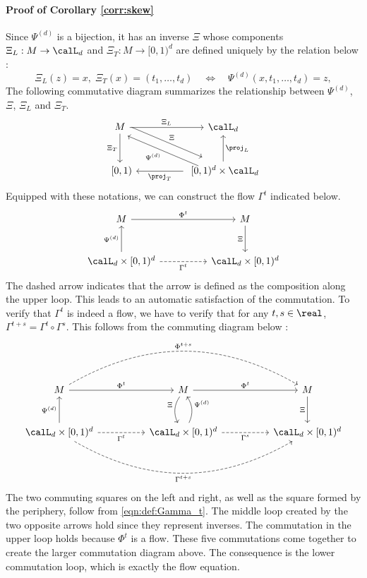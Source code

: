 \documentclass[12pt,oneside]{article}
\newcommand{\Iso}{\Psi}
\newcommand{\IsoInv}{\Xi}
\begin{document}
\paragraph{Proof of Corollary \ref{corr:skew}} Since $\Iso^{(d)}$ is a bijection, it has an inverse $\IsoInv$ whose components $\IsoInv_L : M \to \calL_d$ and  $\IsoInv_T : M\to [0,1)^d$ are defined uniquely by the relation below :
%
\begin{equation}\label{eqn:def:iso_inv}
	\IsoInv_L(z) = x, \; \IsoInv_T(x) = (t_1,\ldots,t_d) \quad \Leftrightarrow \quad \Iso^{(d)}(x,t_1,\ldots,t_d) = z,
\end{equation}
%
The following commutative diagram summarizes the relationship between $\Iso^{(d)}$, $\IsoInv$, $\IsoInv_L$ and $\IsoInv_T$.
%
\[\begin{tikzcd}[column sep = huge, row sep = large]
M \arrow{r}{\IsoInv_L} \arrow{d}[swap]{\IsoInv_T} \arrow[shift left=2]{dr}{\IsoInv} & \calL_d \\
\ [0,1) & \ [0,1)^d \times \calL_d \arrow{l}{\proj_T} \arrow{u}[swap]{\proj_L} \arrow[shift left=2]{ul}{\Iso^{(d)}}
\end{tikzcd}\]
%
Equipped with these notations, we can construct the flow $\Gamma^t$ indicated below.
%
\begin{equation} \label{eqn:def:Gamma_t}
    \begin{tikzcd} [row sep = large]
         M \arrow{rr}{ \Phi^t } & & M \arrow{d}[swap]{\Xi} \\
        \calL_d \times [0,1)^d \arrow{u}{ \Iso^{(d)} } \arrow[dashed]{rr}[swap]{\Gamma^t} & & \calL_d \times [0,1)^d
    \end{tikzcd}
\end{equation}
%
The dashed arrow indicates that the arrow is defined as the composition along the upper loop. This leads to an automatic satisfaction of the commutation. To verify that $\Gamma^t$ is indeed a flow, we have to verify that for any $t,s\in \real$, $\Gamma^{t+s} = \Gamma^t \circ \Gamma^s$. This follows from the commuting diagram below :
%
\[\begin{tikzcd} [row sep = large]
     M \arrow[dashed, bend left=30]{rrrr}{\Phi^{t+s}} \arrow{rr}{ \Phi^t } & & M \arrow[bend right=30]{d}[swap]{\Xi} \arrow{rr}{ \Phi^t } & & M \arrow{d}[swap]{\Xi} \\
    \calL_d \times [0,1)^d \arrow[dashed, bend right=30]{rrrr}[swap]{\Gamma^{t+s}} \arrow{u}{ \Iso^{(d)} } \arrow[dashed]{rr}[swap]{\Gamma^t} & & \calL_d \times [0,1)^d \arrow[bend right=30]{u}[swap]{ \Iso^{(d)} } \arrow[dashed]{rr}[swap]{\Gamma^s} & & \calL_d \times [0,1)^d
\end{tikzcd}\]
%
The two commuting squares on the left and right, as well as the square formed by the periphery, follow from \eqref{eqn:def:Gamma_t}. The middle loop created by the two opposite arrows hold since they represent inverses. The commutation in the upper loop holds because $\Phi^t$ is a flow. These five commutations come together to create the larger commutation diagram above. The consequence is the lower commutation loop, which is exactly the flow equation.
\end{document}
